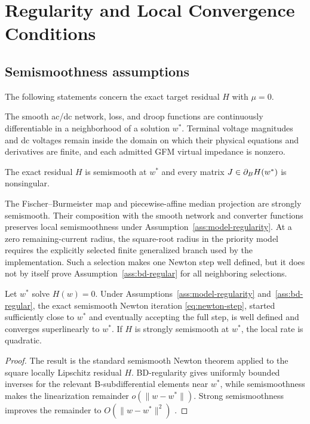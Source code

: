 \section{Regularity and Local Convergence Conditions}\label{sec:convergence}

\subsection{Semismoothness assumptions}

The following statements concern the exact target residual $H$ with $\mu=0$.

\begin{assumption}\label{ass:model-regularity}
The smooth ac/dc network, loss, and droop functions are continuously
differentiable in a neighborhood of a solution $w^*$. Terminal voltage
magnitudes and dc voltages remain inside the domain on which their physical
equations and derivatives are finite, and each admitted GFM virtual impedance
is nonzero.
\end{assumption}

\begin{assumption}\label{ass:bd-regular}
The exact residual $H$ is semismooth at $w^*$ and every matrix
$J\in\partial_B H(w^*)$ is nonsingular.
\end{assumption}

The Fischer--Burmeister map and piecewise-affine median projection are
strongly semismooth. Their composition with the smooth network and converter
functions preserves local semismoothness under
Assumption~\ref{ass:model-regularity}. At a zero remaining-current radius, the
square-root radius in the priority model requires the explicitly selected
finite generalized branch used by the implementation. Such a selection makes
one Newton step well defined, but it does not by itself prove
Assumption~\ref{ass:bd-regular} for all neighboring selections.

\begin{theorem}\label{thm:local-rate}
Let $w^*$ solve $H(w)=0$. Under
Assumptions~\ref{ass:model-regularity} and~\ref{ass:bd-regular}, the exact
semismooth Newton iteration \eqref{eq:newton-step}, started sufficiently close
to $w^*$ and eventually accepting the full step, is well defined and converges
superlinearly to $w^*$. If $H$ is strongly semismooth at $w^*$, the local rate
is quadratic.
\end{theorem}

\begin{proof}
The result is the standard semismooth Newton theorem applied to the square
locally Lipschitz residual $H$. BD-regularity gives uniformly bounded inverses
for the relevant B-subdifferential elements near $w^*$, while semismoothness
makes the linearization remainder $o(\|w-w^*\|)$. Strong semismoothness improves
the remainder to $O(\|w-w^*\|^2)$
\cite{qi1993nonsmooth,facchinei2003complementarity}.
\end{proof}

